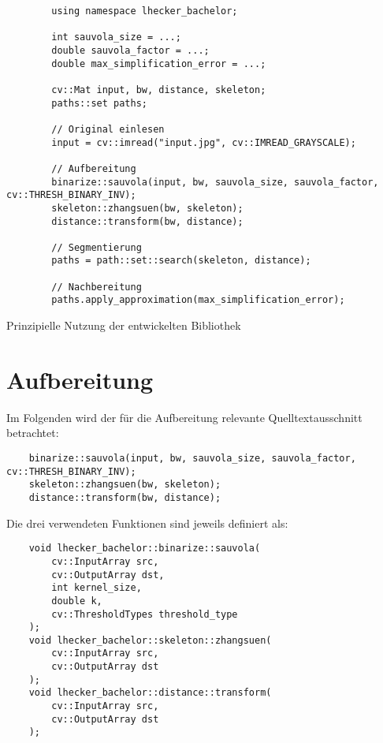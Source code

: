 \begin{listing}[htbp]
    \begin{verbatim}
        using namespace lhecker_bachelor;

        int sauvola_size = ...;
        double sauvola_factor = ...;
        double max_simplification_error = ...;

        cv::Mat input, bw, distance, skeleton;
        paths::set paths;

        // Original einlesen
        input = cv::imread("input.jpg", cv::IMREAD_GRAYSCALE);

        // Aufbereitung
        binarize::sauvola(input, bw, sauvola_size, sauvola_factor, cv::THRESH_BINARY_INV);
        skeleton::zhangsuen(bw, skeleton);
        distance::transform(bw, distance);

        // Segmentierung
        paths = path::set::search(skeleton, distance);

        // Nachbereitung
        paths.apply_approximation(max_simplification_error);
    \end{verbatim}
    \caption{Prinzipielle Nutzung der entwickelten Bibliothek}%
    \label{lst:implementation_code}
\end{listing}

\clearpage
\section{Aufbereitung}%
\label{sec:implementation_preprocess}

Im Folgenden wird der für die Aufbereitung relevante Quelltextausschnitt betrachtet:
\begin{verbatim}
    binarize::sauvola(input, bw, sauvola_size, sauvola_factor, cv::THRESH_BINARY_INV);
    skeleton::zhangsuen(bw, skeleton);
    distance::transform(bw, distance);
\end{verbatim}

Die drei verwendeten Funktionen sind jeweils definiert als:
\begin{verbatim}
    void lhecker_bachelor::binarize::sauvola(
        cv::InputArray src,
        cv::OutputArray dst,
        int kernel_size,
        double k,
        cv::ThresholdTypes threshold_type
    );
    void lhecker_bachelor::skeleton::zhangsuen(
        cv::InputArray src,
        cv::OutputArray dst
    );
    void lhecker_bachelor::distance::transform(
        cv::InputArray src,
        cv::OutputArray dst
    );
\end{verbatim}

